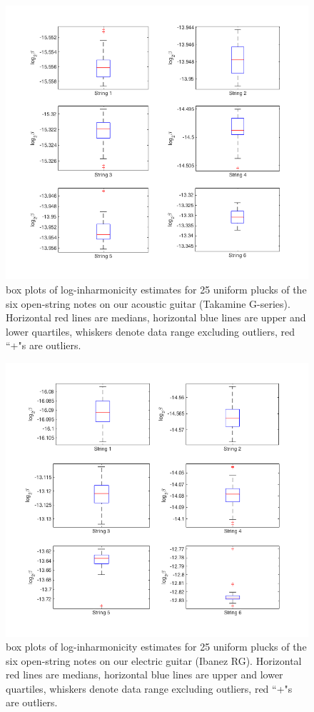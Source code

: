 \documentclass[12pt]{cmuthesis}
\begin{document}
\begin{figure}[!htbp] 
\centering
\includegraphics[scale=0.65]{ag-meas-var}
\caption{box plots of log-inharmonicity estimates for 25 uniform plucks of the six open-string notes on our acoustic guitar (Takamine G-series). Horizontal red lines are medians, horizontal blue lines are upper and lower quartiles, whiskers denote data range excluding outliers, red ``+"s are outliers.}
\label{fig:ag-meas-var}
\end{figure}

\begin{figure}[!htbp] 
\centering
\includegraphics[scale=0.65]{eg-meas-var}
\caption{box plots of log-inharmonicity estimates for 25 uniform plucks of the six open-string notes on our electric guitar (Ibanez RG). Horizontal red lines are medians, horizontal blue lines are upper and lower quartiles, whiskers denote data range excluding outliers, red ``+"s are outliers.}
\label{fig:eg-meas-var}
\end{figure}
\end{document}
